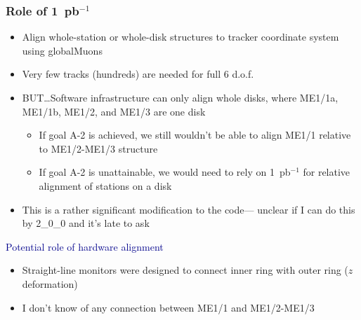 \documentclass[compress]{beamer}
\begin{document}
\begin{frame}
\frametitle{Role of 1~pb$^{-1}$}
\begin{itemize}
\item Align whole-station or whole-disk structures to tracker coordinate system using globalMuons
\item Very few tracks (hundreds) are needed for full 6 d.o.f.
\item BUT\ldots Software infrastructure can only align whole disks, where ME1/1a, ME1/1b, ME1/2, and ME1/3 are one disk
\begin{itemize}
\item If goal A-2 is achieved, we still wouldn't be able to align ME1/1 relative to ME1/2-ME1/3 structure
\item If goal A-2 is unattainable, we would need to rely on 1~pb$^{-1}$ for relative alignment of stations on a disk
\end{itemize}
\item This is a rather significant modification to the code--- unclear
if I can do this by 2\_0\_0 and it's late to ask
\end{itemize}

\vfill
\hspace{-0.83 cm} \textcolor{darkblue}{\Large Potential role of hardware alignment}
\begin{itemize}
\item Straight-line monitors were designed to connect inner ring with outer ring ($z$ deformation)
\item I don't know of any connection between ME1/1 and ME1/2-ME1/3
\end{itemize}

\label{numpages}
\end{frame}
\end{document}
